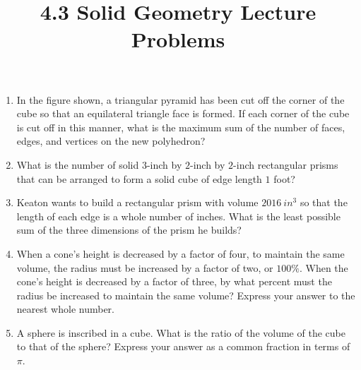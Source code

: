 \documentclass{article}
\title{4.3 Solid Geometry Lecture Problems}
\author{}
\date{}
\begin{document}
\maketitle

\begin{enumerate}
    \item In the figure shown, a triangular pyramid has been cut off the corner of the cube so that an equilateral triangle face is formed.
        If each corner of the cube is cut off in this manner, what is the maximum sum of the number of faces, edges, and vertices on the new polyhedron?
        \begin{center}
        \end{center}
    \vspace{0.5cm}
    \item What is the number of solid $3$-inch by $2$-inch by $2$-inch rectangular prisms that can be arranged to form a solid cube of edge length $1$ foot?
        \vspace{3cm}
    \item Keaton wants to build a rectangular prism with volume $\SI{2016}{in^3}$ so that the length of each edge is a whole number of inches.
        What is the least possible sum of the three dimensions of the prism he builds?
    \vspace{3cm}
    \item When a cone's height is decreased by a factor of four, to maintain the same volume, the radius must be increased by a factor of two, or $100\%$.
        When the cone's height is decreased by a factor of three, by what percent must the radius be increased to maintain the same volume?
        Express your answer to the nearest whole number.
    \vspace{3cm}
    \item A sphere is inscribed in a cube.
        What is the ratio of the volume of the cube to that of the sphere?
        Express your answer as a common fraction in terms of $\pi$.
\vspace{3cm}
\end{enumerate}
\end{document}
